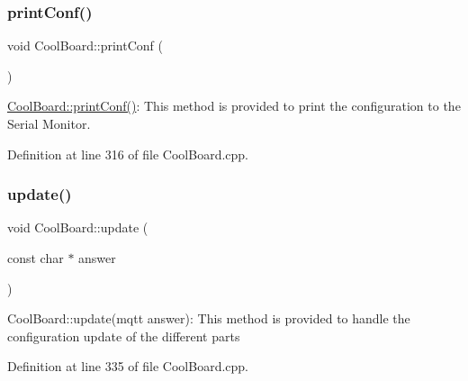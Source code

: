 \subsubsection{\texorpdfstring{print\+Conf()}{printConf()}}
{\footnotesize\ttfamily void Cool\+Board\+::print\+Conf (\begin{DoxyParamCaption}{ }\end{DoxyParamCaption})}

\hyperlink{class_cool_board_a486507b8f0981d3cc671ed31c2145755}{Cool\+Board\+::print\+Conf()}\+: This method is provided to print the configuration to the Serial Monitor. 

Definition at line 316 of file Cool\+Board.\+cpp.

\mbox{\label{class_cool_board_a8612756d3f73198cdde857a66f0fe690}} 
\subsubsection{\texorpdfstring{update()}{update()}}
{\footnotesize\ttfamily void Cool\+Board\+::update (\begin{DoxyParamCaption}\item[{const char $\ast$}]{answer }\end{DoxyParamCaption})}

Cool\+Board\+::update(mqtt answer)\+: This method is provided to handle the configuration update of the different parts 

Definition at line 335 of file Cool\+Board.\+cpp.

